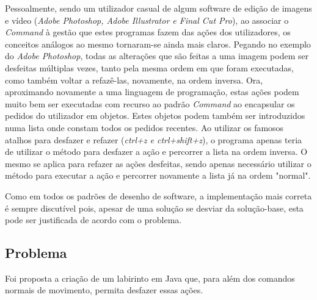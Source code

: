 \documentclass[10pt,portuguese]{article}
\begin{document}
\par Pessoalmente, sendo um utilizador casual de algum software de edição de imagens e vídeo (\textit{Adobe Photoshop, Adobe Illustrator e Final Cut Pro}), ao associar o \textit{Command} à gestão que estes programas fazem das ações dos utilizadores, os conceitos análogos ao mesmo tornaram-se ainda mais claros. Pegando no exemplo do \textit{Adobe Photoshop}, todas as alterações que são feitas a uma imagem podem ser desfeitas múltiplas vezes, tanto pela mesma ordem em que foram executadas, como também voltar a refazê-las, novamente, na ordem inversa. 
Ora, aproximando novamente a uma linguagem de programação, estas ações podem muito bem ser executadas com recurso ao padrão \textit{Command} ao encapsular os pedidos do utilizador em objetos. Estes objetos podem também ser introduzidos numa lista onde constam todos os pedidos recentes. 
Ao utilizar os famosos atalhos para desfazer e refazer (\textit{ctrl+z e ctrl+shift+z}), o programa apenas teria de utilizar o método para desfazer a ação e percorrer a lista na ordem inversa. O mesmo se aplica para refazer as ações desfeitas, sendo apenas necessário utilizar o método para executar a ação e percorrer novamente a lista já na ordem "normal".





\par Como em todos os padrões de desenho de software, a implementação mais correta é sempre discutível pois, apesar de uma solução se desviar da solução-base, esta pode ser justificada de acordo com o problema.

\clearpage

\subsection{Problema}

\par Foi proposta a criação de um labirinto em Java que, para além dos comandos normais de movimento, permita desfazer essas ações.
\end{document}
